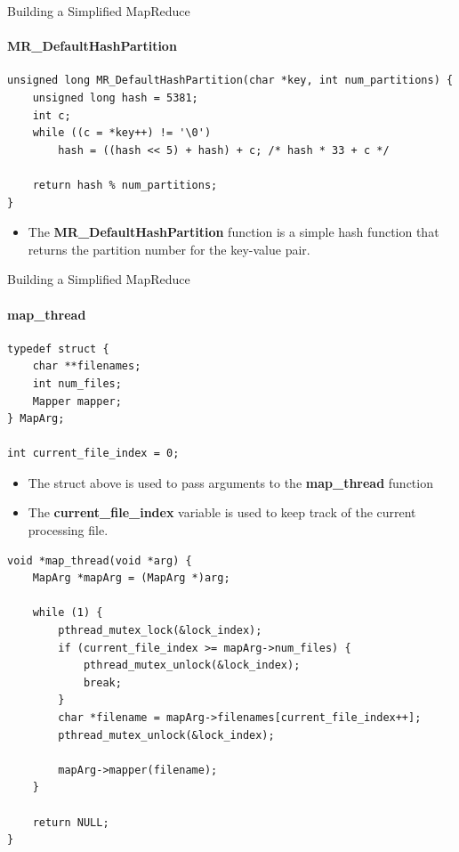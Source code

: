 \documentclass[10pt]{beamer}
\begin{document}
\begin{frame}[fragile]{Building a Simplified MapReduce}
    \framesubtitle{MR\_DefaultHashPartition}
    \begin{lstlisting}
unsigned long MR_DefaultHashPartition(char *key, int num_partitions) {
    unsigned long hash = 5381;
    int c;
    while ((c = *key++) != '\0')
        hash = ((hash << 5) + hash) + c; /* hash * 33 + c */

    return hash % num_partitions;
}
              \end{lstlisting}
    \begin{itemize}
        \item The \textbf{MR\_DefaultHashPartition} function is a simple hash function that returns the partition number for the key-value pair.
    \end{itemize}
\end{frame}

\begin{frame}[fragile]{Building a Simplified MapReduce}
    \framesubtitle{map\_thread}
    \begin{minipage}{.35\linewidth}
        \begin{lstlisting}
typedef struct {
    char **filenames;
    int num_files;
    Mapper mapper;
} MapArg;

int current_file_index = 0;
                      \end{lstlisting}
        \begin{itemize}
            \item The struct above is used to pass arguments to the \textbf{map\_thread} function
            \item The \textbf{current\_file\_index} variable is used to keep track of the current processing file.
        \end{itemize}
    \end{minipage}
    \hspace{13pt}
    \begin{minipage}{.60\linewidth}
        \begin{lstlisting}
void *map_thread(void *arg) {
    MapArg *mapArg = (MapArg *)arg;

    while (1) {
        pthread_mutex_lock(&lock_index);
        if (current_file_index >= mapArg->num_files) {
            pthread_mutex_unlock(&lock_index);
            break;
        }
        char *filename = mapArg->filenames[current_file_index++];
        pthread_mutex_unlock(&lock_index);

        mapArg->mapper(filename);
    }

    return NULL;
}
                      \end{lstlisting}
    \end{minipage}
\end{frame}
\end{document}
